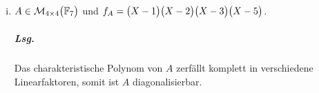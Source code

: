 \documentclass{scrreprt}
\begin{document}
\begin{enumerate}[(i)]
\item $A \in \mathcal{M}_{4 \times 4} \qty\big(\mathbb{F}_7)$ und
  $f_A = \qty\big(X - 1)\qty\big(X - 2)\qty\big(X - 3)\qty\big(X - 5)$.

  \subparagraph{Lsg.} Das charakteristische Polynom von $A$ zerfällt komplett in
  verschiedene Linearfaktoren, somit ist $A$ diagonalisierbar.
\end{enumerate}
\end{document}
